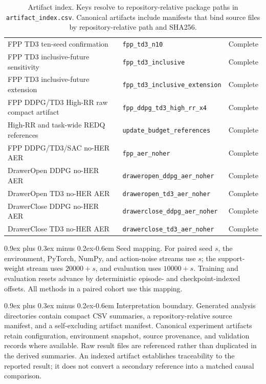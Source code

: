 \documentclass[10pt,letterpaper]{article}
\makeatletter
\renewcommand\paragraph{\@startsection{paragraph}{4}{0pt}%
  {0.9ex plus 0.3ex minus 0.2ex}{-0.6em}%
  {\normalfont\normalsize\bfseries}}
\renewenvironment{table*}[1][tbp]
  {\begin{table}[!htbp]}
  {\end{table}}
\makeatother
\begin{document}
\begin{table}[t]
\begin{tabular}{>{\raggedright\arraybackslash}p{}
                >{\raggedright\arraybackslash}p{}
                >{\raggedright\arraybackslash}p{}}
FPP TD3 ten-seed confirmation &
\texttt{fpp\_td3\_n10} & Complete \\
FPP TD3 inclusive-future sensitivity &
\texttt{fpp\_td3\_inclusive} & Complete \\
FPP TD3 inclusive-future extension &
\texttt{fpp\_td3\_inclusive\_extension} & Complete \\
FPP DDPG/TD3 High-RR raw compact artifact &
\texttt{fpp\_ddpg\_td3\_high\_rr\_x4} & Complete \\
High-RR and task-wide REDQ references &
\texttt{update\_budget\_references} & Complete \\
FPP DDPG/TD3/SAC no-HER AER &
\texttt{fpp\_aer\_noher} & Complete \\
DrawerOpen DDPG no-HER AER &
\texttt{draweropen\_ddpg\_aer\_noher} & Complete \\
DrawerOpen TD3 no-HER AER &
\texttt{draweropen\_td3\_aer\_noher} & Complete \\
DrawerClose DDPG no-HER AER &
\texttt{drawerclose\_ddpg\_aer\_noher} & Complete \\
DrawerClose TD3 no-HER AER &
\texttt{drawerclose\_td3\_aer\_noher} & Complete \\
\bottomrule
\end{tabular}
\caption{Artifact index. Keys resolve to repository-relative package paths in
\texttt{artifact\_index.csv}. Canonical artifacts include manifests that bind
source files by repository-relative path and SHA256.}
\label{tab:supp-artifact-index}
\end{table}

\paragraph{Seed mapping.}
For paired seed \(s\), the environment, PyTorch, NumPy, and action-noise streams
use \(s\); the
support-weight stream uses \(20000+s\), and evaluation uses \(10000+s\).
Training and evaluation resets advance by deterministic episode- and
checkpoint-indexed offsets. All methods in a paired cohort use this mapping.

\paragraph{Interpretation boundary.}
Generated analysis directories contain compact CSV summaries, a
repository-relative source manifest, and a self-excluding artifact manifest.
Canonical experiment artifacts retain configuration, environment snapshot,
source provenance, and validation records where available. Raw result files
are referenced rather than duplicated in the derived summaries. An indexed
artifact establishes traceability to the reported result; it does not convert
a secondary reference into a matched causal comparison.
\end{document}
